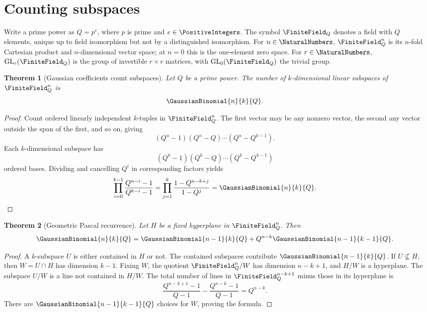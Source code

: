 \documentclass[11pt,a4paper,oneside,openany]{book}
\newtheorem{theorem}{Theorem}[chapter]
\theoremstyle{definition}
\theoremstyle{remark}
\begin{document}
\section{Counting subspaces}

Write a prime power as $Q=p^e$, where $p$ is prime and
$e\in\PositiveIntegers$.  The symbol $\FiniteField_{Q}$ denotes a field with
$Q$ elements, unique up to field isomorphism but not by a distinguished
isomorphism.  For $n\in\NaturalNumbers$, $\FiniteField_{Q}^{n}$ is its
$n$-fold Cartesian product and $n$-dimensional vector space; at $n=0$ this is
the one-element zero space.  For $r\in\NaturalNumbers$,
$\mathrm{GL}_r(\FiniteField_{Q})$ is the group of invertible
$r\times r$ matrices, with $\mathrm{GL}_0(\FiniteField_{Q})$ the trivial
group.

\begin{theorem}[Gaussian coefficients count subspaces]\label{thm:subspace-count}
Let $Q$ be a prime power.  The number of $k$-dimensional linear subspaces of $\FiniteField_{Q}^{n}$ is
\[
 \GaussianBinomial{n}{k}{Q}.
\]
\end{theorem}

\begin{proof}
Count ordered linearly independent $k$-tuples in $\FiniteField_{Q}^{n}$.  The first vector may be any nonzero vector, the second any vector outside the span of the first, and so on, giving
\[
 (Q^n-1)(Q^n-Q)\cdots(Q^n-Q^{k-1}).
\]
Each $k$-dimensional subspace has
\[
 (Q^k-1)(Q^k-Q)\cdots(Q^k-Q^{k-1})
\]
ordered bases.  Dividing and cancelling $Q^i$ in corresponding factors yields
\[
 \prod_{i=0}^{k-1}\frac{Q^{n-i}-1}{Q^{k-i}-1}
 =\prod_{j=1}^{k}\frac{1-Q^{n-k+j}}{1-Q^j}
 =\GaussianBinomial{n}{k}{Q}.
\]
\end{proof}

\begin{theorem}[Geometric Pascal recurrence]\label{thm:geometric-pascal}
Let $H$ be a fixed hyperplane in $\FiniteField_{Q}^{n}$.  Then
\[
 \GaussianBinomial{n}{k}{Q}
 =\GaussianBinomial{n-1}{k}{Q}+Q^{n-k}\GaussianBinomial{n-1}{k-1}{Q}.
\]
\end{theorem}

\begin{proof}
A $k$-subspace $U$ is either contained in $H$ or not.  The contained subspaces contribute $\GaussianBinomial{n-1}{k}{Q}$.  If $U\not\subseteq H$, then $W=U\cap H$ has dimension $k-1$.  Fixing $W$, the quotient $\FiniteField_{Q}^{n}/W$ has dimension $n-k+1$, and $H/W$ is a hyperplane.  The subspace $U/W$ is a line not contained in $H/W$.  The total number of lines in $\FiniteField_{Q}^{n-k+1}$ minus those in its hyperplane is
\[
 \frac{Q^{n-k+1}-1}{Q-1}-\frac{Q^{n-k}-1}{Q-1}=Q^{n-k}.
\]
There are $\GaussianBinomial{n-1}{k-1}{Q}$ choices for $W$, proving the formula.
\end{proof}
\end{document}
